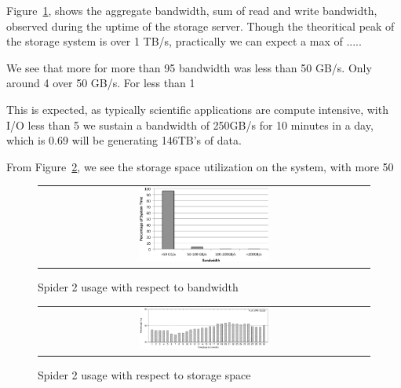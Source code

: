 Figure~\ref{fig:bwUsage}, shows the aggregate bandwidth, sum of read and write bandwidth,
observed during the uptime of the storage server. Though the theoritical peak of the storage system is
over 1 TB/s, practically we can expect a max of .....
  
We see that more for more than 95%
bandwidth was less than 50 GB/s. Only around 4%
over 50 GB/s. For less than 1 %

This is expected, as typically scientific applications are compute intensive,
with I/O less than 5%
we sustain a bandwidth of 250GB/s for 10 minutes in a day, which is 0.69%
will be generating 146TB's of data.

From Figure~\ref{fig:storageUsage}, we see the storage space utilization on the system, with more 50%

\begin{figure}[!thb]
\begin{center}
\begin{tabular}{c}
{\includegraphics[width=0.40\textwidth]{./figs/bwUsage.eps}}\\
\end{tabular}
\vspace{-0.1in}
\caption{Spider 2 usage with respect to bandwidth}
\label{fig:bwUsage}
\end{center}
\end{figure}



\begin{figure}[!thb]
\begin{center}
\begin{tabular}{c}
{\includegraphics[width=0.40\textwidth]{./figs/storageUsage.eps}}\\
\end{tabular}
\vspace{-0.1in}
\caption{Spider 2 usage with respect to storage space}
\label{fig:storageUsage}
\end{center}
\end{figure}


